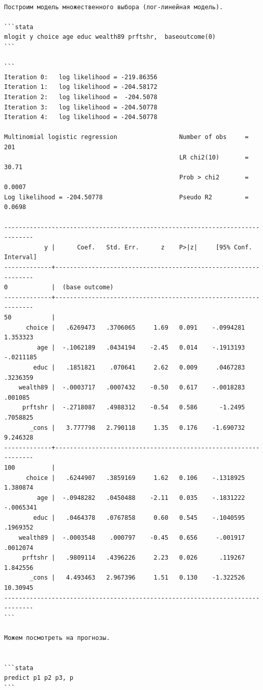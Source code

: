 \documentclass[]{book}
\begin{document}
\begin{verbatim}

Построим модель множественного выбора (лог-линейная модель). 

```stata
mlogit y choice age educ wealth89 prftshr,  baseoutcome(0) 
```

```
Iteration 0:   log likelihood = -219.86356  
Iteration 1:   log likelihood = -204.58172  
Iteration 2:   log likelihood =  -204.5078  
Iteration 3:   log likelihood = -204.50778  
Iteration 4:   log likelihood = -204.50778  

Multinomial logistic regression                 Number of obs     =        201
                                                LR chi2(10)       =      30.71
                                                Prob > chi2       =     0.0007
Log likelihood = -204.50778                     Pseudo R2         =     0.0698

------------------------------------------------------------------------------
           y |      Coef.   Std. Err.      z    P>|z|     [95% Conf. Interval]
-------------+----------------------------------------------------------------
0            |  (base outcome)
-------------+----------------------------------------------------------------
50           |
      choice |   .6269473   .3706065     1.69   0.091    -.0994281    1.353323
         age |  -.1062189   .0434194    -2.45   0.014    -.1913193   -.0211185
        educ |   .1851821    .070641     2.62   0.009     .0467283    .3236359
    wealth89 |  -.0003717   .0007432    -0.50   0.617    -.0018283     .001085
     prftshr |  -.2718087   .4988312    -0.54   0.586      -1.2495    .7058825
       _cons |   3.777798   2.790118     1.35   0.176    -1.690732    9.246328
-------------+----------------------------------------------------------------
100          |
      choice |   .6244907   .3859169     1.62   0.106    -.1318925    1.380874
         age |  -.0948282   .0450488    -2.11   0.035    -.1831222   -.0065341
        educ |   .0464378   .0767858     0.60   0.545    -.1040595    .1969352
    wealth89 |  -.0003548    .000797    -0.45   0.656     -.001917    .0012074
     prftshr |   .9809114   .4396226     2.23   0.026      .119267    1.842556
       _cons |   4.493463   2.967396     1.51   0.130    -1.322526    10.30945
------------------------------------------------------------------------------
```

Можем посмотреть на прогнозы.


```stata
predict p1 p2 p3, p
```


\end{verbatim}
\end{document}
